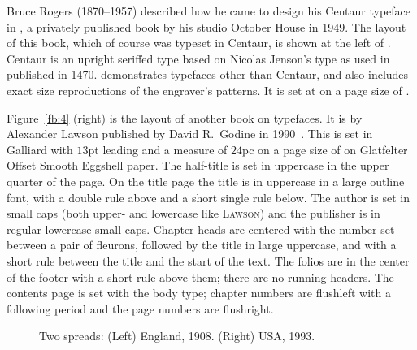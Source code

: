 \documentclass[10pt,a4paper,extrafontsizes]{memoir}
\begin{document}
\begin{paracol}{2}
\switchEng
    Bruce Rogers (1870--1957) 
described how he came to design his Centaur typeface in
, a privately published book by his studio October
House in 1949. The layout of this book, which of course was typeset in
Centaur, is shown at the left of . Centaur is an upright
seriffed type based on Nicolas Jenson's type as 
used in  published in 1470. 
 demonstrates typefaces other than
Centaur, and also includes exact size reproductions of the engraver's 
patterns. It is set at  on a page size of .

   Figure~\ref{fb:4} (right) is the layout of another book on typefaces.
It is  by Alexander Lawson published by
David R.~Godine in 1990~\autocite{LAWSON90}.
This is set in Galliard with $13$pt leading and a measure of $24$pc on
a page size of  on Glatfelter 
Offset Smooth Eggshell paper. The half-title
is set in uppercase in the upper quarter of the page. On the 
title page the title is in uppercase in a large outline 
font, with a double rule above and a short single rule below. The author
is set in small caps (both upper- and lowercase like \textsc{Lawson})
and the publisher is in regular lowercase small caps.
Chapter heads are centered with the number set between
a pair of fleurons, followed by the title in 
large uppercase, and with
a short rule between the title and the start of the text. 
The folios
are in the center of the footer with a short rule
above them; there are no running headers. The contents
page is set with the body type; chapter numbers are flushleft with a 
following period and the page numbers are flushright.
\end{paracol}


\begin{figure}
\centering
\begin{minipage}[b]{\pwlayi}
\end{minipage}
\hfill
\begin{minipage}[b]{\pwlayi}
\end{minipage}
\caption[Two spreads: England, 1908 and USA, 1993]%
        {Two spreads: (Left) England, 1908.
         (Right) USA, 1993.} \label{fb:5}
\end{figure}
\end{document}
